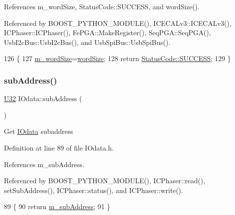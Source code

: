 References m\+\_\+word\+Size, Status\+Code\+::\+S\+U\+C\+C\+E\+SS, and word\+Size().



Referenced by B\+O\+O\+S\+T\+\_\+\+P\+Y\+T\+H\+O\+N\+\_\+\+M\+O\+D\+U\+L\+E(), I\+C\+E\+C\+A\+Lv3\+::\+I\+C\+E\+C\+A\+Lv3(), I\+C\+Phaser\+::\+I\+C\+Phaser(), Fe\+P\+G\+A\+::\+Make\+Register(), Seq\+P\+G\+A\+::\+Seq\+P\+G\+A(), Usb\+I2c\+Bus\+::\+Usb\+I2c\+Bus(), and Usb\+Spi\+Bus\+::\+Usb\+Spi\+Bus().


\begin{DoxyCode}
126                                                  \{
127     \hyperlink{classIOdata_a719b0ce607ada4fa91b12d6ecfa1b4c9}{m\_wordSize}=\hyperlink{classIOdata_a91f9e8b4095ca8365a824e43be36b143}{wordSize};
128     \textcolor{keywordflow}{return} \hyperlink{classStatusCode_a6f565cbeadc76d14c72f047e5e85eb4badd0da38d3ba0d922efd1f4619bc37ad8}{StatusCode::SUCCESS};
129   \}
\end{DoxyCode}
\mbox{\label{classIOdata_a25df48b84364a468373260f823ed9c5f}} 
\subsubsection{\texorpdfstring{sub\+Address()}{subAddress()}}
{\footnotesize\ttfamily \hyperlink{classIOdata_a96fb57f5fcd87b708743abd3c86a5198}{U32} I\+Odata\+::sub\+Address (\begin{DoxyParamCaption}{ }\end{DoxyParamCaption})\hspace{0.3cm}{\ttfamily [inline]}}

Get \hyperlink{classIOdata}{I\+Odata} subaddress 

Definition at line 89 of file I\+Odata.\+h.



References m\+\_\+sub\+Address.



Referenced by B\+O\+O\+S\+T\+\_\+\+P\+Y\+T\+H\+O\+N\+\_\+\+M\+O\+D\+U\+L\+E(), I\+C\+Phaser\+::read(), set\+Sub\+Address(), I\+C\+Phaser\+::status(), and I\+C\+Phaser\+::write().


\begin{DoxyCode}
89                   \{
90     \textcolor{keywordflow}{return} \hyperlink{classIOdata_a562f84e5cace1e392f1b0fca553fff78}{m\_subAddress};
91   \}
\end{DoxyCode}
\mbox{\label{classObject_a73a0f1a41828fdd8303dd662446fb6c3}} 
